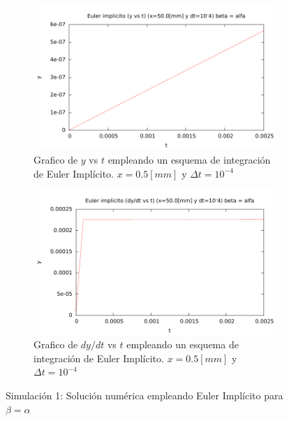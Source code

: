 \begin{center}
\begin{figure} [H]
	\begin{subfigure}[b]{0.8\textwidth}
		\includegraphics{./parte3/graficos/grafico_euler_S1_y_b2.pdf}
		\caption{Grafico de $y$ vs $t$ empleando un esquema de integración de Euler Implícito. $x=0.5[mm]$ y $\Delta t=10^{-4}$} 
		\label{fig:eulerS1b2_y}
	\end{subfigure}
	
	\begin{subfigure}[b]{0.8\textwidth}
		\includegraphics{./parte3/graficos/grafico_euler_S1_dy_b2.pdf}
		\caption{Grafico de $dy/dt$ vs $t$ empleando un esquema de integración de Euler Implícito. $x=0.5[mm]$ y $\Delta t=10^{-4}$} 
		\label{fig:eulerS1b2_dy}
	\end{subfigure}
\caption{Simulación 1: Solución numérica empleando Euler Implícito para $\beta=\alpha$ } \label{euler_S1_b2}
\end{figure}
\end{center}

